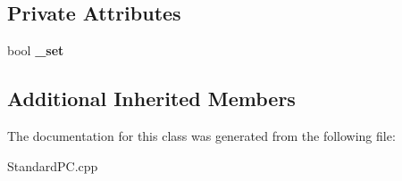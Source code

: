 \subsection*{Private Attributes}
\begin{DoxyCompactItemize}
\item 
\mbox{\label{class_standard_p_c___internal_1_1_legacy_a_t_a_1_1_simpler_signal_a2f892738d0ebc262e54a5dc131e58ce1}} 
bool {\bfseries \+\_\+set}
\end{DoxyCompactItemize}
\subsection*{Additional Inherited Members}


The documentation for this class was generated from the following file\+:\begin{DoxyCompactItemize}
\item 
Standard\+P\+C.\+cpp\end{DoxyCompactItemize}
